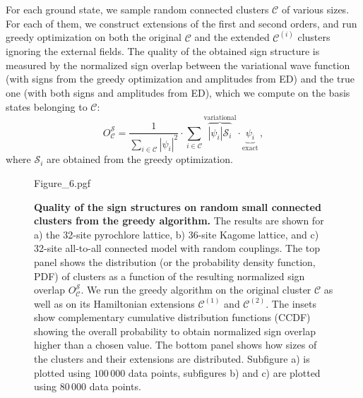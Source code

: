 For each ground state, we sample random connected clusters $\mathcal{C}$ of various sizes. For each of them, we construct extensions of the first and second orders, and run greedy optimization on both the original $\mathcal{C}$ and the extended $\mathcal{C}^{(i)}$ clusters ignoring the external fields. The quality of the obtained sign structure is measured by the normalized sign overlap between the variational wave function (with signs from the greedy optimization and amplitudes from ED) and the true one (with both signs and amplitudes from ED), which we compute on the basis states belonging to $\mathcal{C}$:
\begin{equation}
	O^\mathcal{S}_\mathcal{C} = \frac{1}{\sum_{i \in \mathcal{C}} |\psi_i|^2}
	\cdot \sum\limits_{i \in \mathcal{C}}
            \overbrace{|\psi_i|\mathcal{S}_i}^\text{variational}
            \cdot \underbrace{\psi_i}_\text{exact} \,,
\end{equation}
where $\mathcal{S}_i$ are obtained from the greedy optimization.

\begin{figure}[t]
    \centering
    {Figure_6.pgf}
    \caption{\label{fig:overlap_and_clusters}\textbf{Quality of the sign structures on random small connected clusters from the greedy algorithm.} The results are shown for a) the 32-site pyrochlore lattice, b) 36-site Kagome lattice, and c) 32-site all-to-all connected model with random couplings. 
    The top panel shows the distribution (or the probability density function, PDF) of clusters as a function of the resulting normalized sign overlap $O^\mathcal{S}_\mathcal{C}$. We run the greedy algorithm on the original cluster $\mathcal{C}$ as well as on its Hamiltonian extensions $\mathcal{C}^{(1)}$ and $\mathcal{C}^{(2)}$. The insets show complementary cumulative distribution functions (CCDF) showing the overall probability to obtain normalized sign overlap higher than a chosen value. The bottom panel shows how sizes of the clusters and their extensions are distributed. Subfigure a) is plotted using $100\,000$ data points, subfigures b) and c) are plotted using $80\,000$ data points.}
\end{figure}

